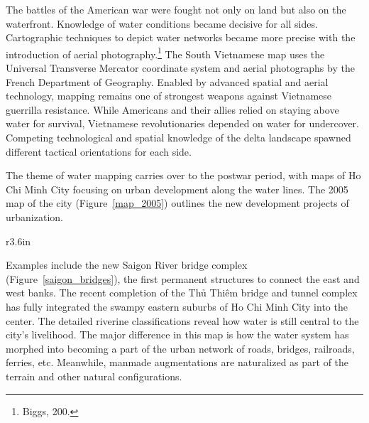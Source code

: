 The battles of the American war were fought not only on land but also on the waterfront. Knowledge of water conditions became decisive for all sides. Cartographic techniques to depict water networks became more precise with the introduction of aerial photography.\footnote{Biggs, 200.} The South Vietnamese map uses the Universal Transverse Mercator coordinate system and aerial photographs by the French Department of Geography. Enabled by advanced spatial and aerial technology, mapping remains one of strongest weapons against Vietnamese guerrilla resistance. While Americans and their allies relied on staying above water for survival, Vietnamese revolutionaries depended on water for undercover. Competing technological and spatial knowledge of the delta landscape spawned different tactical orientations for each side.

The theme of water mapping carries over to the postwar period, with maps of Ho Chi Minh City focusing on urban development along the water lines. The 2005 map of the city (Figure~\ref{map_2005}) outlines the new development projects of urbanization. \en
\begin{wrapfigure}{r}{3.6in}
\vspace{-.2 in}
\caption[Saigon River bridge complex]{Saigon River bridge complex (circled red) (\vi Image cropped from map by Bộ Tài Nguyên và Môi Trường.)}
\label{saigon_bridges}
\vspace{-.2 in}
\end{wrapfigure}
\vi Examples include the new Saigon River bridge complex (Figure~\ref{saigon_bridges}), the first permanent structures to connect the east and west banks. The recent completion of the \vi Thủ Thiêm bridge and tunnel complex has fully integrated the swampy eastern suburbs of Ho Chi Minh City into the center. The detailed riverine classifications reveal how water is still central to the city’s livelihood. The major difference in this map is how the water system has morphed into becoming a part of the urban network of roads, bridges, railroads, ferries, etc. Meanwhile, manmade augmentations are naturalized as part of the terrain and other natural configurations.

